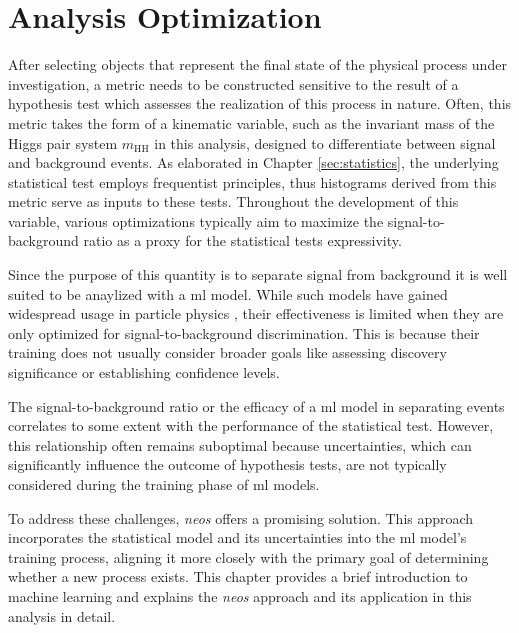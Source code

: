 \chapter{Analysis Optimization}\label{sec:analysis_optimization}

After selecting objects that represent the final state of the physical process under investigation, a metric needs to be constructed sensitive to the result of a hypothesis test which assesses the realization of this process in nature. Often, this metric takes the form of a kinematic variable, such as the invariant mass of the Higgs pair system $m_\text{HH}$ in this analysis, designed to differentiate between signal and background events. As elaborated in Chapter \ref{sec:statistics}, the underlying statistical test employs frequentist principles, thus histograms derived from this metric serve as inputs to these tests. Throughout the development of this variable, various optimizations typically aim to maximize the signal-to-background ratio as a proxy for the statistical tests expressivity.

Since the purpose of this quantity is to separate signal from background it is well suited to be anaylized with a \ac{ml} model. While such models have gained widespread usage in particle physics \citep{albertsson2019machine,shlomi2020graph,feickert2021living,Schwartz2021Modern}, their effectiveness is limited when they are only optimized for signal-to-background discrimination. This is because their training does not usually consider broader goals like assessing discovery significance or establishing confidence levels.

The signal-to-background ratio or the efficacy of a \ac{ml} model in separating events correlates to some extent with the performance of the statistical test.  However, this relationship often remains suboptimal because uncertainties, which can significantly influence the outcome of hypothesis tests, are not typically considered during the training phase of \ac{ml} models.

To address these challenges, \textit{\ac{neos}} \citep{Simpson_2023} offers a promising solution. This approach incorporates the statistical model and its uncertainties into the \ac{ml} model's training process, aligning it more closely with the primary goal of determining whether a new process exists. This chapter provides a brief introduction to machine learning and explains the \textit{\ac{neos}} approach and its application in this analysis in detail.


